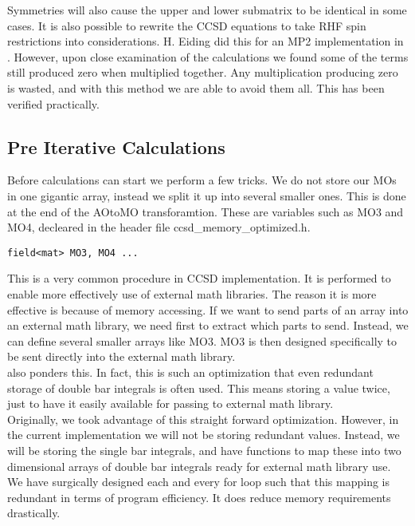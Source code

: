 \documentclass[a4paper,norsk,11pt,twoside]{report}
\begin{document}
Symmetries will also cause the upper and lower submatrix to be identical in some cases. It is also possible to rewrite the CCSD equations to take RHF spin restrictions into considerations. H. Eiding did this for an MP2 implementation in \cite{hmeiding}. However, upon close examination of the calculations we found some of the terms still produced zero when multiplied together. Any multiplication producing zero is wasted, and with this method we are able to avoid them all. This has been verified practically. 

\subsection{Pre Iterative Calculations}
Before calculations can start we perform a few tricks. We do not store our MOs in one gigantic array, instead we split it up into several smaller ones. This is done at the end of the AOtoMO transforamtion. These are variables such as MO3 and MO4, decleared in the header file ccsd\_memory\_optimized.h.

\begin{lstlisting}
field<mat> MO3, MO4 ...
\end{lstlisting}
This is a very common procedure in CCSD implementation. It is performed to enable more effectively use of external math libraries. The reason it is more effective is because of memory accessing. If we want to send parts of an array into an external math library, we need first to extract which parts to send. Instead, we can define several smaller arrays like MO3. MO3 is then designed specifically to be sent directly into the external math library. \\

\cite{ccsd_fac3} also ponders this. In fact, this is such an optimization that even redundant storage of double bar integrals is often used. This means storing a value twice, just to have it easily available for passing to external math library. \\

Originally, we took advantage of this straight forward optimization. However, in the current implementation we will not be storing redundant values. Instead, we will be storing the single bar integrals, and have functions to map these into two dimensional arrays of double bar integrals ready for external math library use. We have surgically designed each and every for loop such that this mapping is redundant in terms of program efficiency. It does reduce memory requirements drastically. \\
\end{document}

